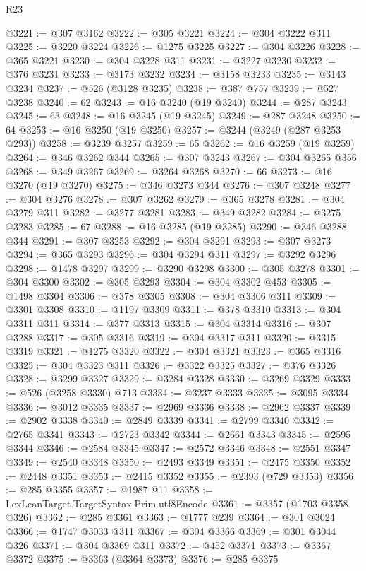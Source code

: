 \begin{lexlean}{R23}
\begin{coremodule}
@3221 := @307 @3162
@3222 := @305 @3221
@3224 := @304 @3222 @311
@3225 := @3220 @3224
@3226 := @1275 @3225
@3227 := @304 @3226
@3228 := @365 @3221
@3230 := @304 @3228 @311
@3231 := @3227 @3230
@3232 := @376 @3231
@3233 := @3173 @3232
@3234 := @3158 @3233
@3235 := @3143 @3234
@3237 := @526 (@3128 @3235)
@3238 := @387 @757
@3239 := @527 @3238
@3240 := 62
@3243 := @16 @3240 (@19 @3240)
@3244 := @287 @3243
@3245 := 63
@3248 := @16 @3245 (@19 @3245)
@3249 := @287 @3248
@3250 := 64
@3253 := @16 @3250 (@19 @3250)
@3257 := @3244 (@3249 (@287 @3253 @293))
@3258 := @3239 @3257
@3259 := 65
@3262 := @16 @3259 (@19 @3259)
@3264 := @346 @3262 @344
@3265 := @307 @3243
@3267 := @304 @3265 @356
@3268 := @349 @3267
@3269 := @3264 @3268
@3270 := 66
@3273 := @16 @3270 (@19 @3270)
@3275 := @346 @3273 @344
@3276 := @307 @3248
@3277 := @304 @3276
@3278 := @307 @3262
@3279 := @365 @3278
@3281 := @304 @3279 @311
@3282 := @3277 @3281
@3283 := @349 @3282
@3284 := @3275 @3283
@3285 := 67
@3288 := @16 @3285 (@19 @3285)
@3290 := @346 @3288 @344
@3291 := @307 @3253
@3292 := @304 @3291
@3293 := @307 @3273
@3294 := @365 @3293
@3296 := @304 @3294 @311
@3297 := @3292 @3296
@3298 := @1478 @3297
@3299 := @3290 @3298
@3300 := @305 @3278
@3301 := @304 @3300
@3302 := @305 @3293
@3304 := @304 @3302 @453
@3305 := @1498 @3304
@3306 := @378 @3305
@3308 := @304 @3306 @311
@3309 := @3301 @3308
@3310 := @1197 @3309
@3311 := @378 @3310
@3313 := @304 @3311 @311
@3314 := @377 @3313
@3315 := @304 @3314
@3316 := @307 @3288
@3317 := @305 @3316
@3319 := @304 @3317 @311
@3320 := @3315 @3319
@3321 := @1275 @3320
@3322 := @304 @3321
@3323 := @365 @3316
@3325 := @304 @3323 @311
@3326 := @3322 @3325
@3327 := @376 @3326
@3328 := @3299 @3327
@3329 := @3284 @3328
@3330 := @3269 @3329
@3333 := @526 (@3258 @3330) @713
@3334 := @3237 @3333
@3335 := @3095 @3334
@3336 := @3012 @3335
@3337 := @2969 @3336
@3338 := @2962 @3337
@3339 := @2902 @3338
@3340 := @2849 @3339
@3341 := @2799 @3340
@3342 := @2765 @3341
@3343 := @2723 @3342
@3344 := @2661 @3343
@3345 := @2595 @3344
@3346 := @2584 @3345
@3347 := @2572 @3346
@3348 := @2551 @3347
@3349 := @2540 @3348
@3350 := @2493 @3349
@3351 := @2475 @3350
@3352 := @2448 @3351
@3353 := @2415 @3352
@3355 := @2393 (@729 @3353)
@3356 := @285 @3355
@3357 := @1987 @11
@3358 := LexLeanTarget.TargetSyntax.Prim.utf8Encode
@3361 := @3357 (@1703 @3358 @326)
@3362 := @285 @3361
@3363 := @1777 @239
@3364 := @301 @3024
@3366 := @1747 @3033 @311
@3367 := @304 @3366
@3369 := @301 @3044 @326
@3371 := @304 @3369 @311
@3372 := @452 @3371
@3373 := @3367 @3372
@3375 := @3363 (@3364 @3373)
@3376 := @285 @3375

\end{coremodule}
\end{lexlean}
